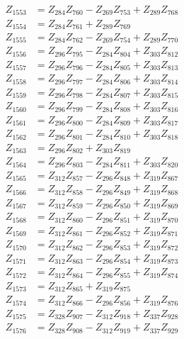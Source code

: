 \begin{multicols}{2}
\begin{align}
Z_{1553} &= Z_{284}Z_{760} - Z_{269}Z_{753} + Z_{289}Z_{768} \nonumber \\
Z_{1554} &= Z_{284}Z_{761} + Z_{289}Z_{769} \nonumber \\
Z_{1555} &= Z_{284}Z_{762} - Z_{269}Z_{754} + Z_{289}Z_{770} \nonumber \\
Z_{1556} &= Z_{296}Z_{795} - Z_{284}Z_{804} + Z_{303}Z_{812} \nonumber \\
Z_{1557} &= Z_{296}Z_{796} - Z_{284}Z_{805} + Z_{303}Z_{813} \nonumber \\
Z_{1558} &= Z_{296}Z_{797} - Z_{284}Z_{806} + Z_{303}Z_{814} \nonumber \\
Z_{1559} &= Z_{296}Z_{798} - Z_{284}Z_{807} + Z_{303}Z_{815} \nonumber \\
Z_{1560} &= Z_{296}Z_{799} - Z_{284}Z_{808} + Z_{303}Z_{816} \nonumber \\
Z_{1561} &= Z_{296}Z_{800} - Z_{284}Z_{809} + Z_{303}Z_{817} \nonumber \\
Z_{1562} &= Z_{296}Z_{801} - Z_{284}Z_{810} + Z_{303}Z_{818} \nonumber \\
Z_{1563} &= Z_{296}Z_{802} + Z_{303}Z_{819} \nonumber \\
Z_{1564} &= Z_{296}Z_{803} - Z_{284}Z_{811} + Z_{303}Z_{820} \nonumber \\
Z_{1565} &= Z_{312}Z_{857} - Z_{296}Z_{848} + Z_{319}Z_{867} \nonumber \\
Z_{1566} &= Z_{312}Z_{858} - Z_{296}Z_{849} + Z_{319}Z_{868} \nonumber \\
Z_{1567} &= Z_{312}Z_{859} - Z_{296}Z_{850} + Z_{319}Z_{869} \nonumber \\
Z_{1568} &= Z_{312}Z_{860} - Z_{296}Z_{851} + Z_{319}Z_{870} \nonumber \\
Z_{1569} &= Z_{312}Z_{861} - Z_{296}Z_{852} + Z_{319}Z_{871} \nonumber \\
Z_{1570} &= Z_{312}Z_{862} - Z_{296}Z_{853} + Z_{319}Z_{872} \nonumber \\
Z_{1571} &= Z_{312}Z_{863} - Z_{296}Z_{854} + Z_{319}Z_{873} \nonumber \\
Z_{1572} &= Z_{312}Z_{864} - Z_{296}Z_{855} + Z_{319}Z_{874} \nonumber \\
Z_{1573} &= Z_{312}Z_{865} + Z_{319}Z_{875} \nonumber \\
Z_{1574} &= Z_{312}Z_{866} - Z_{296}Z_{856} + Z_{319}Z_{876} \nonumber \\
Z_{1575} &= Z_{328}Z_{907} - Z_{312}Z_{918} + Z_{337}Z_{928} \nonumber \\
Z_{1576} &= Z_{328}Z_{908} - Z_{312}Z_{919} + Z_{337}Z_{929} \nonumber \\

\end{align}
\end{multicols}
